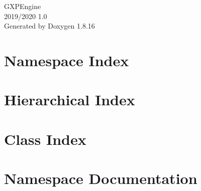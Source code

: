 \let\mypdfximage\pdfximage\def\pdfximage{\immediate\mypdfximage}\documentclass[twoside]{book}
\newcommand{\+}{\discretionary{\mbox{\scriptsize$\hookleftarrow$}}{}{}}
\newcommand{\clearemptydoublepage}{%
  \newpage{\pagestyle{empty}\cleardoublepage}%
}
\begin{document}
\hypersetup{pageanchor=false,
             bookmarksnumbered=true,
             pdfencoding=unicode
            }
\begin{titlepage}
\vspace*{7cm}
\begin{center}%
{\Large G\+X\+P\+Engine \\[1ex]\large 2019/2020 1.\+0 }\\
\vspace*{1cm}
{\large Generated by Doxygen 1.8.16}\\
\end{center}
\end{titlepage}
\clearemptydoublepage
{}
\tableofcontents
\clearemptydoublepage
{}
\hypersetup{pageanchor=true}

\chapter{Namespace Index}

\chapter{Hierarchical Index}

\chapter{Class Index}

\chapter{Namespace Documentation}





\end{document}
